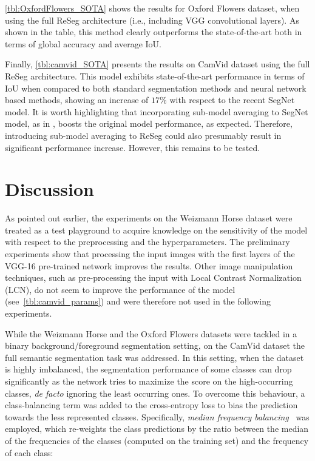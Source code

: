\autoref{tbl:OxfordFlowers_SOTA} shows the results for Oxford Flowers dataset,
when using the full ReSeg architecture (i.e., including VGG convolutional
layers).  As shown in the table, this method clearly outperforms the
state-of-the-art both in terms of global accuracy and average IoU.

Finally, \autoref{tbl:camvid_SOTA} presents the results on CamVid dataset using
the full ReSeg architecture. This model exhibits state-of-the-art performance
in terms of IoU when compared to both standard segmentation methods and neural
network based methods, showing an increase of $17\%$ with respect to the recent
SegNet model. It is worth highlighting that incorporating sub-model averaging
to SegNet model, as in \citep{Kendall2015bayesiansegnet}, boosts the original
model performance, as expected. Therefore, introducing sub-model averaging to
ReSeg could also presumably result in significant performance increase.
However, this remains to be tested.



\section{Discussion}

As pointed out earlier, the experiments on the Weizmann Horse dataset were
treated as a test playground to acquire knowledge on the sensitivity of the
model with respect to the preprocessing and the hyperparameters. The
preliminary experiments show that processing the input images with the first
layers of the VGG-16 pre-trained network improves the results. Other image
manipulation techniques, such as pre-processing the input with Local Contrast
Normalization (LCN), do not seem to improve the performance of the model
(see~\autoref{tbl:camvid_params}) and were therefore not used in the following
experiments.

While the Weizmann Horse and the Oxford Flowers datasets were tackled in a
binary background/foreground segmentation setting, on the CamVid dataset the
full semantic segmentation task was addressed. In this setting, when the
dataset is highly imbalanced, the segmentation performance of some classes can
drop significantly as the network tries to maximize the score on the
high-occurring classes, {\em de facto} \/ignoring the least occurring ones. To
overcome this behaviour, a class-balancing term was added to the cross-entropy
loss to bias the prediction towards the less represented classes. Specifically,
\emph{median frequency balancing}~\citep{eigen2015predicting} was employed,
which re-weights the class predictions by the ratio between the median of the
frequencies of the classes (computed on the training set) and the frequency of
each class:


